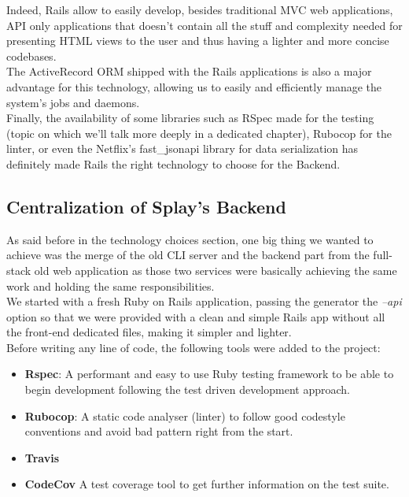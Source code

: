 \documentclass{eplmastersthesis}
\begin{document}
        Indeed, Rails allow to easily develop, besides traditional MVC web
        applications, API only applications that doesn't contain all the stuff
        and complexity needed for presenting HTML views to the user and thus
        having a lighter and more concise codebases.\\
        The ActiveRecord \cite{activerecord} ORM shipped with the Rails
        applications is also a major advantage for this technology, allowing us
        to easily and efficiently manage the system's jobs and daemons.\\
        Finally, the availability of some libraries such as RSpec made for the
        testing (topic on which we'll talk more deeply in a dedicated chapter),
        Rubocop for the linter, or even the Netflix's fast\_jsonapi library for
        data serialization has definitely made Rails the right technology to
        choose for the Backend.

      \subsection{Centralization of Splay's Backend}

        As said before in the technology choices section, one big thing
        we wanted to achieve was the merge of the old CLI server and
        the backend part from the full-stack old web application as those two
        services were basically achieving the same work and holding the
        same responsibilities.\\

        We started with a fresh Ruby on Rails application, passing the
        generator the \textit{--api} option so that we were provided with
        a clean and simple Rails app without all the front-end dedicated
        files, making it simpler and lighter.\\

        Before writing any line of code, the following tools were added
        to the project:

        \begin{itemize}
          \item \textbf{Rspec}: A performant and easy to use Ruby testing
          framework to be able to begin development following the test
          driven development approach.
          \item \textbf{Rubocop}: A static code analyser (linter) to follow
          good codestyle conventions and avoid bad pattern right from the start.
          \item \textbf{Travis}
          \item \textbf{CodeCov} A test coverage tool to get further
          information on the test suite.
        \end{itemize}
\end{document}
